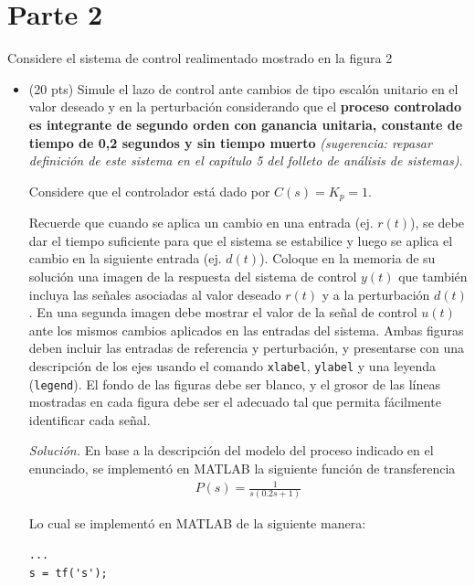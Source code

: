 \section*{Parte 2}

Considere el sistema de control realimentado mostrado en la figura 2

\begin{itemize}
\item (20 pts) Simule el lazo de control ante cambios de tipo escalón unitario en el valor
deseado y en la perturbación considerando que el \textbf{proceso controlado es integrante
de segundo orden con ganancia unitaria, constante de tiempo de 0,2 segundos y
sin tiempo muerto} \textit{(sugerencia: repasar definición de este sistema en el capítulo 5 del
folleto de análisis de sistemas).}

Considere que el controlador está dado por $C(s) = K_p = 1$.

Recuerde que cuando se aplica un cambio en una entrada (ej. $r(t)$), se debe dar el
tiempo suficiente para que el sistema se estabilice y luego se aplica el cambio en la
siguiente entrada (ej. $d(t)$). Coloque en la memoria de su solución una imagen de la
respuesta del sistema de control $y(t)$ que también incluya las señales asociadas
al valor deseado $r(t)$ y a la perturbación $d(t)$. En una segunda imagen debe mostrar
el valor de la señal de control $u(t)$ ante los mismos cambios aplicados en las entradas
del sistema. Ambas figuras deben incluir las entradas de referencia y perturbación, y
presentarse con una descripción de los ejes usando el comando \texttt{xlabel}, \texttt{ylabel} y una
leyenda (\texttt{legend}). El fondo de las figuras debe ser blanco, y el grosor de las líneas
mostradas en cada figura debe ser el adecuado tal que permita fácilmente identificar
cada señal.

\vspace{1em}

    \textit{Solución.} En base a la descripción del modelo del proceso indicado en el enunciado, se implementó en MATLAB la siguiente función de transferencia
\begin{align*}
    P(s) = \frac{1}{s(0.2s+1)}
\end{align*}

Lo cual se implementó en MATLAB de la siguiente manera:

\vspace{1em}

\begin{mdframed}
\begin{verbatim}
...
s = tf('s');


\end{verbatim}
\end{mdframed}
\end{itemize}
